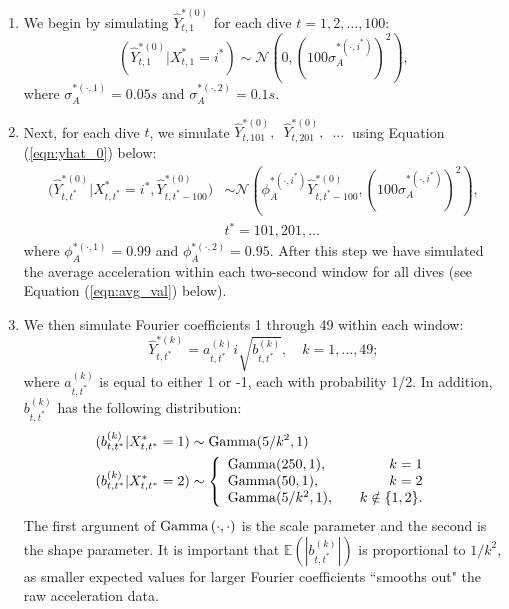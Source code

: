 \begin{enumerate}
    \item We begin by simulating $\hat{Y}^{*(0)}_{t,1}$ for each dive $t = 1,2,\ldots,100$:
    $$
    	(\hat{Y}^{*(0)}_{t,1}|X^*_{t,1} = i^*) \sim \mathcal{N} \left(0, \left(100\sigma_A^{*(\cdot,i^*)}\right)^2 \right),
    $$
    where $\sigma_A^{*(\cdot,1)} = 0.05s$ and $\sigma_A^{*(\cdot,2)} = 0.1s$. 
    \item Next, for each dive $t$, we simulate $\hat{Y}^{*(0)}_{t,101},\enspace \hat{Y}^{*(0)}_{t,201}, \enspace \ldots ~ $ using Equation (\ref{eqn:yhat_0}) below:
    \begin{align}	
        \Big(\hat{Y}^{*(0)}_{t,t^*}|X^*_{t,t^*} = i^*,\hat{Y}^{*(0)}_{t,t^*-100}\Big) &\sim \mathcal{N} \left(\phi_A^{*(\cdot,i^*)} \hat{Y}^{*(0)}_{t,t^*-100}, \left(100\sigma_A^{*(\cdot,i^*)}\right)^2 \right), \nonumber \\
        &t^* = 101,201,\ldots
    	\label{eqn:yhat_0}
    \end{align}
    where $\phi_A^{*(\cdot,1)} = 0.99$ and $\phi_A^{*(\cdot,2)} = 0.95$. After this step we have simulated the average acceleration within each two-second window for all dives (see Equation (\ref{eqn:avg_val}) below).
    \item We then simulate Fourier coefficients 1 through 49 within each window:
    \begin{equation}
        \hat{Y}^{*(k)}_{t,t^*} = a_{t,t^*}^{(k)} i\sqrt{b^{(k)}_{t,t^*}}, \quad k = 1,\ldots,49;
        \label{eqn:abYhat}
    \end{equation}
    where $a^{(k)}_{t,t^*}$ is equal to either 1 or -1, each with probability 1/2. In addition, $b^{(k)}_{t,t^*}$ has the following distribution:
    \begin{align}
    \begin{split}
    	(b^{(k)}_{t,t^*}|X^*_{t,t^*} = 1) &\sim {\rm{Gamma}}(5/k^2, 1) \\
    	(b^{(k)}_{t,t^*}|X^*_{t,t^*} = 2) &\sim \left\{\begin{array}{lr}
    	{\rm{Gamma}}(250,1), & k = 1 \\
    	{\rm{Gamma}}(50,1), & k = 2 \\
    	{\rm{Gamma}}(5/k^2, 1), \quad & k \notin \{1,2\}.
    	\end{array}\right. 
    \end{split}
    \label{eqn:bdist}
    \end{align}
    The first argument of ${\rm{Gamma}}\left(\cdot,\cdot\right)$ is the scale parameter and the second is the shape parameter. It is important that $\mathbb{E}\left(|b^{(k)}_{t,t^*}|\right)$ is proportional to $1/k^2$, as smaller expected values for larger Fourier coefficients ``smooths out" the raw acceleration data.

\end{enumerate}
